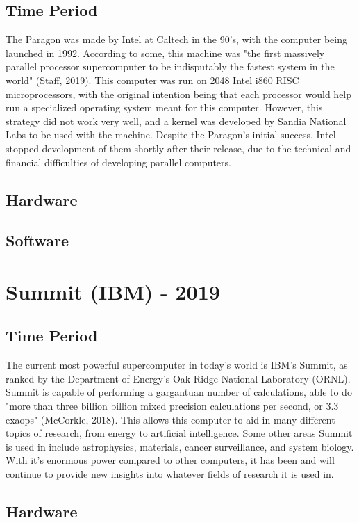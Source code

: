\documentclass[letterpaper, 10 pt, conference]{IEEEconf}
\begin{document}
\subsection{Time Period}
The Paragon was made by Intel at Caltech in the 90's, with the computer being launched in 1992. According to some, this machine was "the first massively parallel processor supercomputer to be indisputably the fastest system in the world" (Staff, 2019). This computer was run on 2048 Intel i860 RISC microprocessors, with the original intention being that each processor would help run a specialized operating system meant for this computer. However, this strategy did not work very well, and a kernel was developed by Sandia National Labs to be used with the machine. Despite the Paragon's initial success, Intel stopped development of them shortly after their release, due to the technical and financial difficulties of developing parallel computers.
\subsection{Hardware}
\subsection{Software}


\section{Summit (IBM) - 2019}
\subsection{Time Period}
The current most powerful supercomputer in today's world is IBM's Summit, as ranked by the Department of Energy's Oak Ridge National Laboratory (ORNL). Summit is capable of performing a gargantuan number of calculations, able to do "more than three billion billion mixed precision calculations per second, or 3.3 exaops" (McCorkle, 2018). This allows this computer to aid in many different topics of research, from energy to artificial intelligence. Some other areas Summit is used in include astrophysics, materials, cancer surveillance, and system biology. With it's enormous power compared to other computers, it has been and will continue to provide new insights into whatever fields of research it is used in.
\subsection{Hardware}
\end{document}
